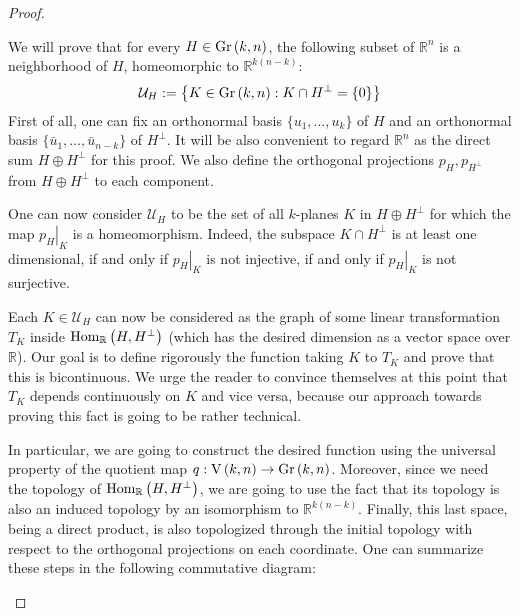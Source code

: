 \begin{proof}
\begin{b_item}
\item We will prove that for every $H\in\Gr{k}{n}$, the following subset of $\mathbb{R}^n$ is a neighborhood of $H$, homeomorphic to $\mathbb{R}^{k(n-k)}$:
\[\mathcal{U}_H:=\left\{K\in\Gr{k}{n}:K\cap H^{\perp}=\{0\}\right\}\]
First of all, one can fix an orthonormal basis $\{u_1,\ldots,u_k\}$ of $H$ and an orthonormal basis $\{\bar{u}_1,\ldots,\bar{u}_{n-k}\}$ of $H^{\perp}$. It will be also convenient to regard $\mathbb{R}^n$ as the direct sum $H\oplus H^{\perp}$ for this proof. We also define the orthogonal projections $p_H,p_{H^{\perp}}$ from $H\oplus H^{\perp}$ to each component.

One can now consider $\mathcal{U}_H$ to be the set of all $k$-planes $K$ in $H\oplus H^{\perp}$ for which the map $\left.p_H\right|_{K}$ is a homeomorphism. Indeed, the subspace $K\cap H^{\perp}$ is at least one dimensional, if and only if $\left.p_H\right|_K$ is not injective, if and only if $\left.p_H\right|_K$ is not surjective.

Each $K\in\mathcal{U}_H$ can now be considered as the graph of some linear transformation $T_K$ inside $\mathrm{Hom}_{\mathbb{R}}\left(H,H^{\perp}\right)$ (which has the desired dimension as a vector space over $\mathbb{R}$). Our goal is to define rigorously the function taking $K$ to $T_K$ and prove that this is bicontinuous. We urge the reader to convince themselves at this point that $T_K$ depends continuously on $K$ and vice versa, because our approach towards proving this fact is going to be rather technical.

In particular, we are going to construct the desired function using the universal property of the quotient map $q:\St{k}{n}\to\Gr{k}{n}$. Moreover, since we need the topology of $\mathrm{Hom}_{\mathbb{R}}\left(H,H^{\perp}\right)$, we are going to use the fact that its topology is also an induced topology by an isomorphism to $\mathbb{R}^{k(n-k)}$. Finally, this last space, being a direct product, is also topologized through the initial topology with respect to the orthogonal projections on each coordinate. One can summarize these steps in the following commutative diagram:

\begin{center}
\end{center}


\end{b_item}
\end{proof}
